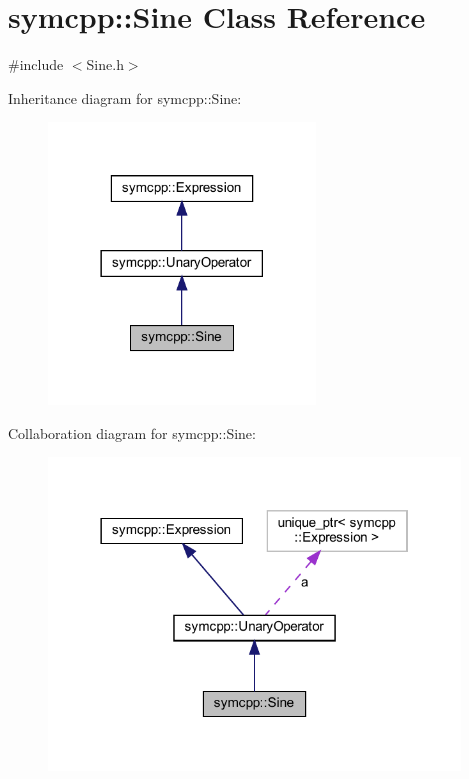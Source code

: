 \hypertarget{classsymcpp_1_1Sine}{}\section{symcpp\+::Sine Class Reference}
\label{classsymcpp_1_1Sine}


{\ttfamily \#include $<$Sine.\+h$>$}



Inheritance diagram for symcpp\+::Sine\+:
\nopagebreak
\begin{figure}[H]
\begin{center}
\leavevmode
\includegraphics[width=201pt]{classsymcpp_1_1Sine__inherit__graph}
\end{center}
\end{figure}


Collaboration diagram for symcpp\+::Sine\+:
\nopagebreak
\begin{figure}[H]
\begin{center}
\leavevmode
\includegraphics[width=310pt]{classsymcpp_1_1Sine__coll__graph}
\end{center}
\end{figure}
